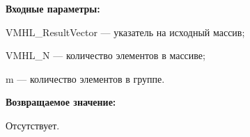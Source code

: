 \textbf{Входные параметры:}
 
VMHL\_ResultVector --- указатель на исходный массив;
 
VMHL\_N --- количество элементов в массиве;
 
m --- количество элементов в группе.

\textbf{Возвращаемое значение:}

Отсутствует.
